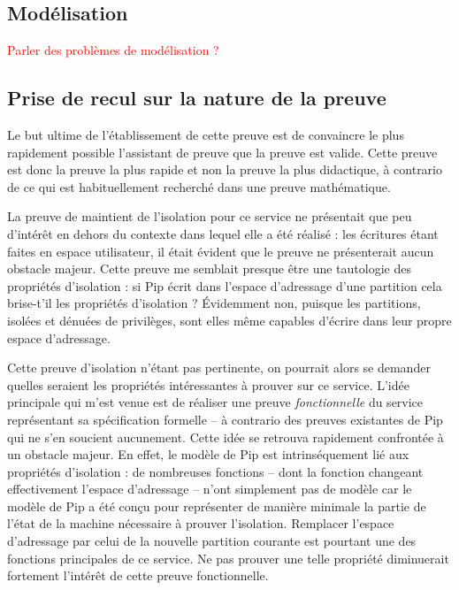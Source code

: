 		\subsection{Modélisation}

		\textcolor{red}{Parler des problèmes de modélisation ?}

		\subsection{Prise de recul sur la nature de la preuve}

		Le but ultime de l'établissement de cette preuve est de convaincre le plus rapidement possible l'assistant de preuve que la preuve est valide. Cette preuve est donc la preuve la plus rapide et non la preuve la plus didactique, à contrario de ce qui est habituellement recherché dans une preuve mathématique.

		La preuve de maintient de l'isolation pour ce service ne présentait que peu d'intérêt en dehors du contexte dans lequel elle a été réalisé : les écritures étant faites en espace utilisateur, il était évident que le preuve ne présenterait aucun obstacle majeur. Cette preuve me semblait presque être une tautologie des propriétés d'isolation : si Pip écrit dans l'espace d'adressage d'une partition cela brise-t'il les propriétés d'isolation ? Évidemment non, puisque les partitions, isolées et dénuées de privilèges, sont elles même capables d'écrire dans leur propre espace d'adressage.

		Cette preuve d'isolation n'étant pas pertinente, on pourrait alors se demander quelles seraient les propriétés intéressantes à prouver sur ce service. L'idée principale qui m'est venue est de réaliser une preuve \emph{fonctionnelle} du service représentant sa spécification formelle -- à contrario des preuves existantes de Pip qui ne s'en soucient aucunement. Cette idée se retrouva rapidement confrontée à un obstacle majeur. En effet, le modèle de Pip est intrinséquement lié aux propriétés d'isolation : de nombreuses fonctions -- dont la fonction changeant effectivement l'espace d'adressage -- n'ont simplement pas de modèle car le modèle de Pip a été conçu pour représenter de manière minimale la partie de l'état de la machine nécessaire à prouver l'isolation. Remplacer l'espace d'adressage par celui de la nouvelle partition courante est pourtant une des fonctions principales de ce service. Ne pas prouver une telle propriété diminuerait fortement l'intérêt de cette preuve fonctionnelle.

